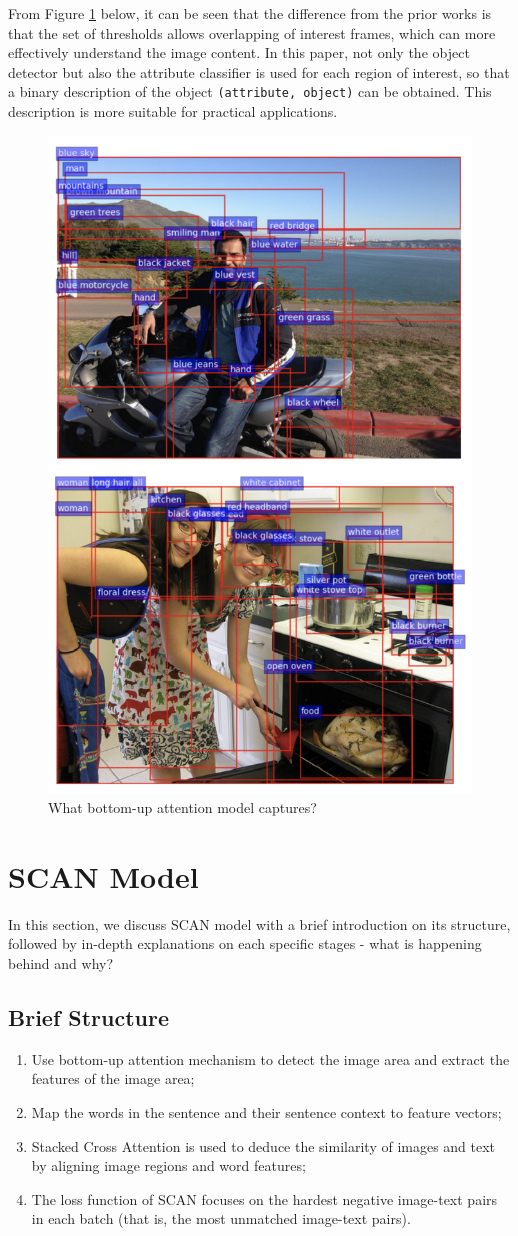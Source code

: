 From Figure \ref{fig:bottomup} below, it can be seen that the difference from the prior works is that the set of thresholds allows overlapping of interest frames, which can more effectively understand the image content. In this paper, not only the object detector but also the attribute classifier is used for each region of interest, so that a binary description of the object \verb|(attribute, object)| can be obtained. This description is more suitable for practical applications.

\begin{figure}[h!]
\centering
\includegraphics[width=.5\textwidth]{bottomup.pdf}
\caption{What bottom-up attention model captures? \cite{bottomup}}
\label{fig:bottomup}
\end{figure}

\section{SCAN Model}
In this section, we discuss SCAN model with a brief introduction on its structure, followed by in-depth explanations on each specific stages - what is happening behind and why?

\subsection{Brief Structure}
\begin{enumerate}
    \item Use bottom-up attention mechanism \cite{bottomup} to detect the image area and extract the features of the image area;
    \item Map the words in the sentence and their sentence context to feature vectors;
    \item Stacked Cross Attention is used to deduce the similarity of images and text by aligning image regions and word features;
    \item The loss function of SCAN focuses on the hardest negative image-text pairs in each batch (that is, the most unmatched image-text pairs).
\end{enumerate}

